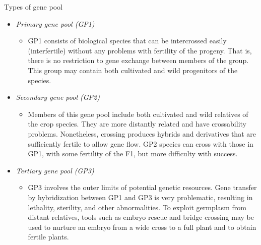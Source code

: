 \documentclass[11pt,ignorenonframetext,aspectratio=169]{beamer}
\providecommand{\tightlist}{%
  \setlength{\itemsep}{0pt}\setlength{\parskip}{0pt}}
\begin{document}
\begin{frame}{Types of gene pool}
\protect\hypertarget{types-of-gene-pool}{}
\begin{itemize}
\tightlist
\item
  \emph{Primary gene pool (GP1)}

  \begin{itemize}
  \tightlist
  \item
    GP1 consists of biological species that can be intercrossed easily
    (interfertile) without any problems with fertility of the progeny.
    That is, there is no restriction to gene exchange between members of
    the group. This group may contain both cultivated and wild
    progenitors of the species.
  \end{itemize}
\item
  \emph{Secondary gene pool (GP2)}

  \begin{itemize}
  \tightlist
  \item
    Members of this gene pool include both cultivated and wild relatives
    of the crop species. They are more distantly related and have
    crossability problems. Nonetheless, crossing produces hybrids and
    derivatives that are sufficiently fertile to allow gene flow. GP2
    species can cross with those in GP1, with some fertility of the F1,
    but more difficulty with success.
  \end{itemize}
\end{itemize}
\end{frame}

\begin{frame}{}
\protect\hypertarget{section-6}{}
\begin{itemize}
\tightlist
\item
  \emph{Tertiary gene pool (GP3)}

  \begin{itemize}
  \tightlist
  \item
    GP3 involves the outer limits of potential genetic resources. Gene
    transfer by hybridization between GP1 and GP3 is very problematic,
    resulting in lethality, sterility, and other abnormalities. To
    exploit germplasm from distant relatives, tools such as embryo
    rescue and bridge crossing may be used to nurture an embryo from a
    wide cross to a full plant and to obtain fertile plants.
  \end{itemize}
\end{itemize}
\end{frame}
\end{document}
